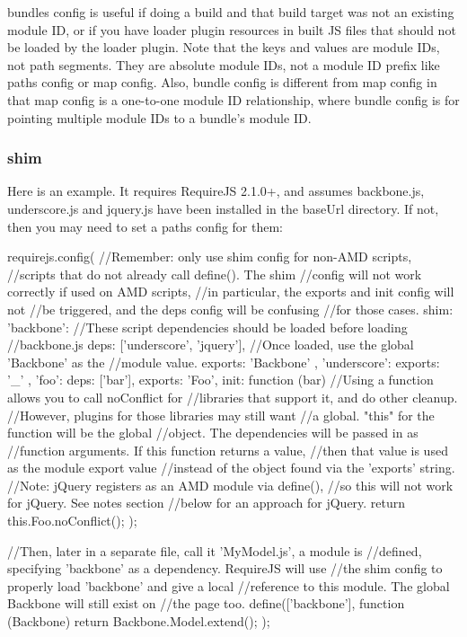 bundles config is useful if doing a build and that build target was not an existing module ID, or if you have loader plugin resources in built JS files that should not be loaded by the loader plugin. Note that the keys and values are module IDs, not path segments. They are absolute module IDs, not a module ID prefix like paths config or map config. Also, bundle config is different from map config in that map config is a one-to-one module ID relationship, where bundle config is for pointing multiple module IDs to a bundle's module ID.


\subsubsection{shim}
Here is an example. It requires RequireJS 2.1.0+, and assumes backbone.js, underscore.js and jquery.js have been installed in the baseUrl directory. If not, then you may need to set a paths config for them:
\begin{JavaScript}
requirejs.config({
    //Remember: only use shim config for non-AMD scripts,
    //scripts that do not already call define(). The shim
    //config will not work correctly if used on AMD scripts,
    //in particular, the exports and init config will not
    //be triggered, and the deps config will be confusing
    //for those cases.
    shim: {
        'backbone': {
            //These script dependencies should be loaded before loading
            //backbone.js
            deps: ['underscore', 'jquery'],
            //Once loaded, use the global 'Backbone' as the
            //module value.
            exports: 'Backbone'
        },
        'underscore': {
            exports: '_'
        },
        'foo': {
            deps: ['bar'],
            exports: 'Foo',
            init: function (bar) {
                //Using a function allows you to call noConflict for
                //libraries that support it, and do other cleanup.
                //However, plugins for those libraries may still want
                //a global. "this" for the function will be the global
                //object. The dependencies will be passed in as
                //function arguments. If this function returns a value,
                //then that value is used as the module export value
                //instead of the object found via the 'exports' string.
                //Note: jQuery registers as an AMD module via define(),
                //so this will not work for jQuery. See notes section
                //below for an approach for jQuery.
                return this.Foo.noConflict();
            }
        }
    }
});

//Then, later in a separate file, call it 'MyModel.js', a module is
//defined, specifying 'backbone' as a dependency. RequireJS will use
//the shim config to properly load 'backbone' and give a local
//reference to this module. The global Backbone will still exist on
//the page too.
define(['backbone'], function (Backbone) {
  return Backbone.Model.extend({});
});
\end{JavaScript}

